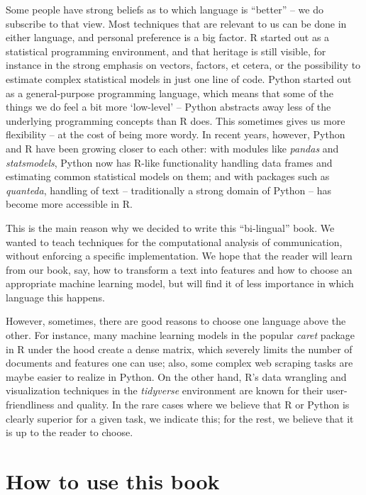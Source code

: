 Some people have strong beliefs as to which language is ``better'' -- we 
do subscribe to that view. Most techniques that are relevant to us can be
done in either language, and personal preference is a big factor. R
started out as a statistical programming environment, and that
heritage is still visible, for instance in the strong emphasis on
vectors, factors, et cetera, or the possibility to estimate complex
statistical models in just one line of code. Python started out as a
general-purpose programming language, which means that some of the things we
do feel a bit more `low-level' -- Python abstracts away less of the
underlying programming concepts than R does. This sometimes gives us
more flexibility -- at the cost of being more wordy.
In recent years, however, Python and R have been
growing closer to each other: with modules like \emph{pandas} and
\emph{statsmodels}, Python now has R-like functionality handling data
frames and estimating common statistical models on them; and with
packages such as \emph{quanteda}, handling of text -- traditionally a
strong domain of Python -- has become more accessible in R.

This is the main reason why we decided to write this ``bi-lingual''
book. We wanted to teach techniques for the computational analysis of
communication, without enforcing a specific implementation. We hope
that the reader will learn from our book, say, how to transform a text
into features and how to choose an appropriate machine learning model,
but will find it of less importance in which language this happens.

However, sometimes, there are good reasons to choose one language above
the other. For instance, many machine learning models in the popular \emph{caret} package in R under the
hood create a dense matrix, which severely limits the number of
documents and features one can use; also, some complex web scraping
tasks are maybe easier to realize in Python. On the other hand, R's
data wrangling and visualization techniques in the \emph{tidyverse}
environment are known for their user-friendliness and quality.  In the
rare cases where we believe that R or Python is clearly superior for a
given task, we indicate this; for the rest, we believe that it is up to
the reader to choose.

%

\section{How to use this book}
\label{sec:howtouse}

